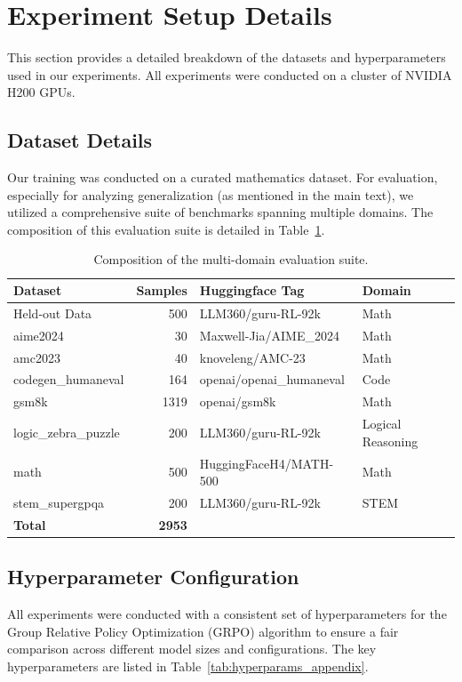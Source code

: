 \section{Experiment Setup Details}
\label{app:exp_details}

This section provides a detailed breakdown of the datasets and hyperparameters used in our experiments. All experiments were conducted on a cluster of NVIDIA H200 GPUs.

\subsection{Dataset Details}
\label{app:datasets}
Our training was conducted on a curated mathematics dataset. For evaluation, especially for analyzing generalization (as mentioned in the main text), we utilized a comprehensive suite of benchmarks spanning multiple domains. The composition of this evaluation suite is detailed in Table~\ref{tab:eval_suite_appendix}.

\begin{table}[t]
\centering
\begin{tabular}{lrll}
\toprule
\textbf{Dataset} & \textbf{Samples} & \textbf{Huggingface Tag} & \textbf{Domain} \\
\midrule
Held-out Data & 500 & LLM360/guru-RL-92k & Math \\
aime2024 & 30 & Maxwell-Jia/AIME\_2024 & Math \\
amc2023 & 40 & knoveleng/AMC-23 & Math \\
codegen\_humaneval & 164 & openai/openai\_humaneval & Code \\
gsm8k & 1319 & openai/gsm8k & Math \\
logic\_zebra\_puzzle & 200 & LLM360/guru-RL-92k & Logical Reasoning \\
math & 500 & HuggingFaceH4/MATH-500 & Math \\
stem\_supergpqa & 200 & LLM360/guru-RL-92k & STEM \\
\midrule
\textbf{Total} & \textbf{2953} & & \\
\bottomrule
\end{tabular}
\caption{Composition of the multi-domain evaluation suite.}
\label{tab:eval_suite_appendix}
\end{table}

\subsection{Hyperparameter Configuration}
\label{app:hyperparams}
All experiments were conducted with a consistent set of hyperparameters for the Group Relative Policy Optimization (GRPO) algorithm to ensure a fair comparison across different model sizes and configurations. The key hyperparameters are listed in Table~\ref{tab:hyperparams_appendix}.

